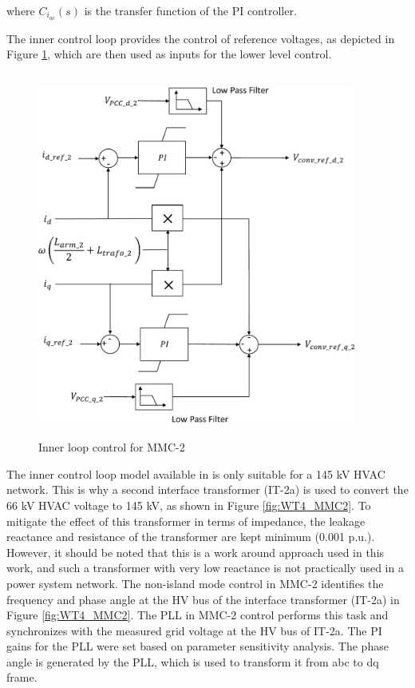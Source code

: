 where $C_{i_{ac}}\left(s\right)$ is the transfer function of the \gls{PI} controller.

The inner control loop provides the control of reference voltages, as depicted in Figure \ref{fig:Inner_control_loop_MMC}, which are then used as inputs for the lower level control.

\begin{figure}[H]
\centering
    \includegraphics[height = 12cm,width = 10.5cm]{Diagrams/Chapter_4/Inner_control_loop_MMC.pdf}
    \caption{Inner loop control for MMC-2 \cite{saad2015modelisation}}
    \label{fig:Inner_control_loop_MMC}
\end{figure}

The inner control loop model available in \cite{vrana2013cigre} is only suitable for a 145 kV \gls{HVAC} network. This is why a second interface transformer (IT-2a) is used to convert the 66 kV \gls{HVAC} voltage to 145 kV, as shown in Figure \ref{fig:WT4_MMC2}. To mitigate the effect of this transformer in terms of impedance, the leakage reactance and resistance of the transformer are kept minimum (0.001 p.u.). However, it should be noted that this is a work around approach used in this work, and such a transformer with very low reactance is not practically used in a power system network. The non-island mode control in \gls{MMC}-2 identifies the frequency and phase angle at the \gls{HV} bus of the interface transformer (IT-2a) in Figure \ref{fig:WT4_MMC2}. The \gls{PLL} in \gls{MMC}-2 control performs this task and synchronizes with the measured grid voltage at the \gls{HV} bus of IT-2a. The \gls{PI} gains for the \gls{PLL} were set based on parameter sensitivity analysis. The phase angle is generated by the \gls{PLL}, which is used to transform it from abc to \gls{dq} frame.

